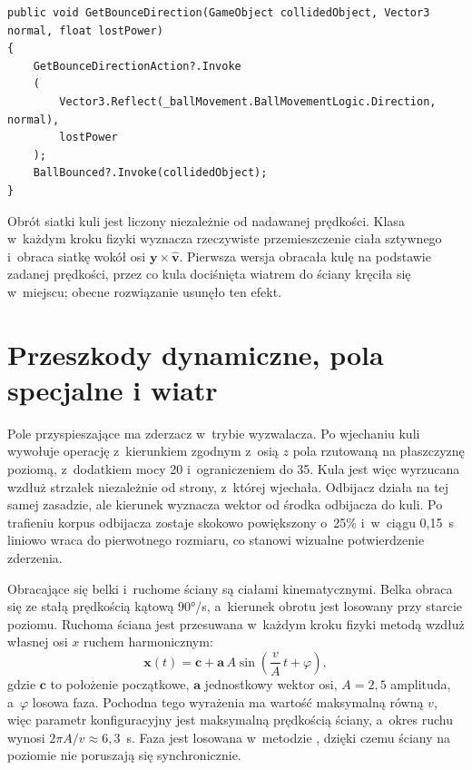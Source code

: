 \begin{lstlisting}[caption={Wyznaczanie kierunku po odbiciu w~klasie BounceBallLogic; \zrodloWlasne},label=lst:odbicie]
public void GetBounceDirection(GameObject collidedObject, Vector3 normal, float lostPower)
{
    GetBounceDirectionAction?.Invoke
    (
        Vector3.Reflect(_ballMovement.BallMovementLogic.Direction, normal),
        lostPower
    );
    BallBounced?.Invoke(collidedObject);
}
\end{lstlisting}

Obrót siatki kuli jest liczony niezależnie od nadawanej prędkości. Klasa
 w~każdym kroku fizyki wyznacza rzeczywiste przemieszczenie ciała
sztywnego i~obraca siatkę wokół osi $\mathbf{y}\times\hat{\mathbf{v}}$. Pierwsza wersja
obracała kulę na podstawie zadanej prędkości, przez co kula dociśnięta wiatrem do ściany
kręciła się w~miejscu; obecne rozwiązanie usunęło ten efekt.

\section{Przeszkody dynamiczne, pola specjalne i wiatr}

Pole przyspieszające ma zderzacz w~trybie wyzwalacza. Po wjechaniu kuli wywołuje operację
 z~kierunkiem zgodnym z~osią $z$ pola rzutowaną na płaszczyznę poziomą,
z~dodatkiem mocy 20 i~ograniczeniem do 35. Kula jest więc wyrzucana wzdłuż strzałek
niezależnie od strony, z~której wjechała. Odbijacz działa na tej samej zasadzie, ale
kierunek wyznacza wektor od środka odbijacza do kuli. Po trafieniu korpus odbijacza
zostaje skokowo powiększony o~25\% i~w~ciągu 0{,}15~s liniowo wraca do pierwotnego
rozmiaru, co stanowi wizualne potwierdzenie zderzenia.

Obracające się belki i~ruchome ściany są ciałami kinematycznymi. Belka obraca się ze
stałą prędkością kątową 90°/s, a~kierunek obrotu jest losowany przy starcie poziomu.
Ruchoma ściana jest przesuwana w~każdym kroku fizyki metodą  wzdłuż
własnej osi $x$ ruchem harmonicznym:
\begin{equation}
  \mathbf{x}(t) = \mathbf{c} + \mathbf{a}\,A \sin\!\left(\frac{v}{A}\,t + \varphi\right),
  \label{eq:sciana}
\end{equation}
gdzie $\mathbf{c}$ to położenie początkowe, $\mathbf{a}$ jednostkowy wektor osi, $A = 2{,}5$
amplituda, a~$\varphi$ losowa faza. Pochodna tego wyrażenia ma wartość maksymalną równą
$v$, więc parametr konfiguracyjny  jest maksymalną prędkością
ściany, a~okres ruchu wynosi $2\pi A/v \approx 6{,}3$~s. Faza jest losowana w~metodzie
, dzięki czemu ściany na poziomie nie poruszają się synchronicznie.

